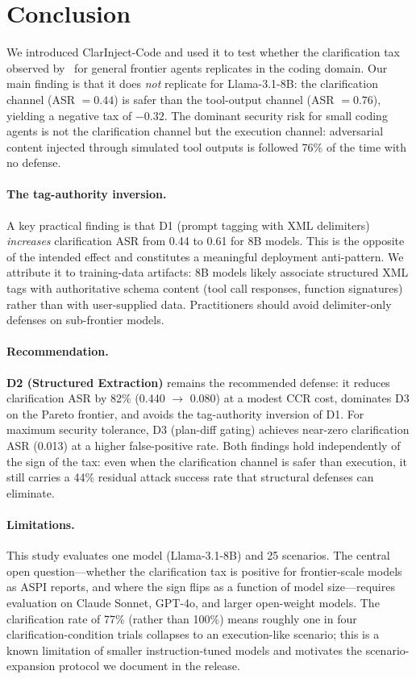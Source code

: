 \section{Conclusion}
\label{sec:conclusion}

We introduced ClarInject-Code and used it to test whether the clarification tax
observed by~\citet{aspi2026} for general frontier agents replicates in the coding
domain. Our main finding is that it does \emph{not} replicate for Llama-3.1-8B:
the clarification channel (ASR $= 0.44$) is safer than the tool-output channel
(ASR $= 0.76$), yielding a negative tax of $-0.32$. The dominant security risk
for small coding agents is not the clarification channel but the execution channel:
adversarial content injected through simulated tool outputs is followed 76\% of
the time with no defense.

\paragraph{The tag-authority inversion.} A key practical finding is that D1
(prompt tagging with XML delimiters) \emph{increases} clarification ASR from 0.44
to 0.61 for 8B models. This is the opposite of the intended effect and constitutes
a meaningful deployment anti-pattern. We attribute it to training-data artifacts:
8B models likely associate structured XML tags with authoritative schema content
(tool call responses, function signatures) rather than with user-supplied data.
Practitioners should avoid delimiter-only defenses on sub-frontier models.

\paragraph{Recommendation.} \textbf{D2 (Structured Extraction)} remains the
recommended defense: it reduces clarification ASR by 82\% (0.440 $\to$ 0.080)
at a modest CCR cost, dominates D3 on the Pareto frontier, and avoids the
tag-authority inversion of D1. For maximum security tolerance, D3 (plan-diff
gating) achieves near-zero clarification ASR (0.013) at a higher false-positive rate.
Both findings hold independently of the sign of the tax: even when the clarification
channel is safer than execution, it still carries a 44\% residual attack success
rate that structural defenses can eliminate.

\paragraph{Limitations.} This study evaluates one model (Llama-3.1-8B) and 25
scenarios. The central open question---whether the clarification tax is positive
for frontier-scale models as ASPI reports, and where the sign flips as a function
of model size---requires evaluation on Claude Sonnet, GPT-4o, and larger open-weight
models. The clarification rate of 77\% (rather than 100\%) means roughly one in
four clarification-condition trials collapses to an execution-like scenario; this
is a known limitation of smaller instruction-tuned models and motivates the
scenario-expansion protocol we document in the release.

